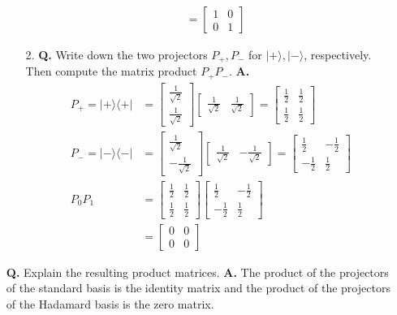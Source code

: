 \documentclass[main.tex]{subfiles}
\begin{document}
\begin{enumerate}
\begin{enumerate}
\begin{align*}
                                            & = \left[\begin{array}{ll} 1 & 0 \\ 0 & 1 \end{array}\right]
        \end{align*}
    \item[2.] \textbf{Q.} Write down the two projectors $P_{+}, P_{-}$ for $|+\rangle,|-\rangle$, respectively. Then compute the matrix product $P_{+} P_{-}$. \textbf{A.}
        \begin{align*}
            P_{+} = |+ \rangle \langle +|   & = \left[\begin{array}{c} \frac{1}{\sqrt{2}} \\ \frac{1}{\sqrt{2}} \end{array}\right] 
                                                \left[\begin{array}{ll} \frac{1}{\sqrt{2}} & \frac{1}{\sqrt{2}} \end{array}\right] 
                                                = \left[\begin{array}{ll} \frac{1}{2} & \frac{1}{2} \\ \frac{1}{2} & \frac{1}{2} \end{array}\right]\\
            P_{-} = |- \rangle \langle -|   & = \left[\begin{array}{c} \frac{1}{\sqrt{2}} \\ -\frac{1}{\sqrt{2}} \end{array}\right] 
                                                \left[\begin{array}{ll} \frac{1}{\sqrt{2}} & -\frac{1}{\sqrt{2}} \end{array}\right] 
                                                = \left[\begin{array}{ll} \frac{1}{2} & -\frac{1}{2} \\ -\frac{1}{2} & \frac{1}{2} \end{array}\right]\\
            P_{0}P_{1}                      & = \left[\begin{array}{ll} \frac{1}{2} & \frac{1}{2} \\ \frac{1}{2} & \frac{1}{2} \end{array}\right]
                                                \left[\begin{array}{ll} \frac{1}{2} & -\frac{1}{2} \\ -\frac{1}{2} & \frac{1}{2} \end{array}\right]\\
                                            & = \left[\begin{array}{ll} 0 & 0 \\ 0 & 0 \end{array}\right]
        \end{align*}
    \end{enumerate}
    
    \textbf{Q.} Explain the resulting product matrices. \textbf{A.} The product of the projectors of the standard basis is the identity matrix and the product of the projectors of the Hadamard basis is the zero matrix.

\end{enumerate}
\end{document}
